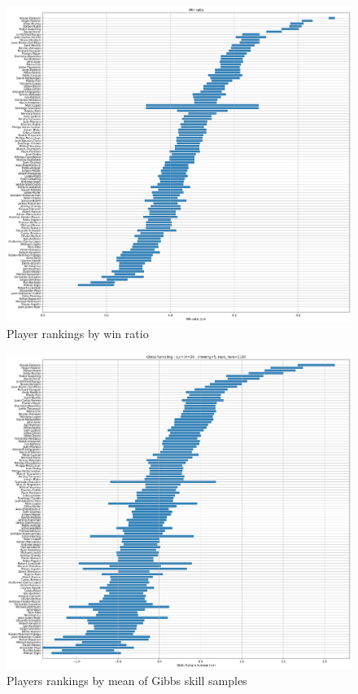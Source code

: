 \documentclass[]{article}
\begin{document}
\begin{figure}[!h]
	\centering
	\includegraphics[width=\linewidth]{win-ratio.png}
	\caption{Player rankings by win ratio}
	\label{fig:win-ratio-ranking}
\end{figure}

\begin{figure}[!h]
	\centering
	\includegraphics[width=\linewidth]{gibbs-ranking.png}
	\caption{Players rankings by mean of Gibbs skill samples}
	\label{fig:gibbs-ranking}
\end{figure}
\end{document}
